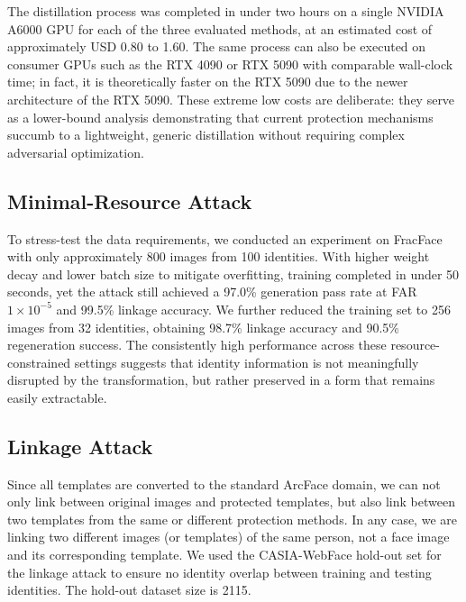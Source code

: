 The distillation process was completed in under two hours on a single NVIDIA A6000 GPU for each of the three evaluated methods, at an estimated cost of approximately USD 0.80 to 1.60. The same process can also be executed on consumer GPUs such as the RTX 4090 or RTX 5090 with comparable wall-clock time; in fact, it is theoretically faster on the RTX 5090 due to the newer architecture of the RTX 5090. These extreme low costs are deliberate: they serve as a lower-bound analysis demonstrating that current protection mechanisms succumb to a lightweight, generic distillation without requiring complex adversarial optimization.


\subsection{Minimal-Resource Attack}
To stress-test the data requirements, we conducted an experiment on FracFace with only approximately 800 images from 100 identities. With higher weight decay and lower batch size to mitigate overfitting, training completed in under 50 seconds, yet the attack still achieved a 97.0\% generation pass rate at FAR $1\times10^{-5}$ and 99.5\% linkage accuracy. We further reduced the training set to 256 images from 32 identities, obtaining 98.7\% linkage accuracy and 90.5\% regeneration success. The consistently high performance across these resource-constrained settings suggests that identity information is not meaningfully disrupted by the transformation, but rather preserved in a form that remains easily extractable.

\subsection{Linkage Attack}

Since all templates are converted to the standard ArcFace domain, we can not only link between original images and protected templates, but also link between two templates from the same or different protection methods. In any case, we are linking two different images (or templates) of the same person, not a face image and its corresponding template. We used the CASIA-WebFace hold-out set for the linkage attack to ensure no identity overlap between training and testing identities. The hold-out dataset size is 2115.  

